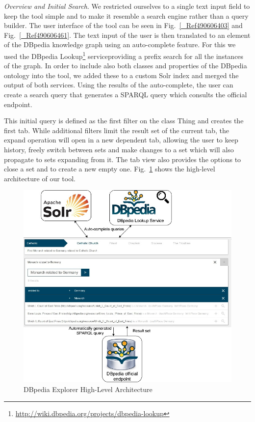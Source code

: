 \documentclass{sig-alternate}
\makeatletter
\def\maxwidth#1{\ifdim\Gin@nat@width>#1 #1\else\Gin@nat@width\fi}
\makeatother
\begin{document}
{\em Overview and Initial Search}. We restricted ourselves to a single text input ﬁeld to keep the tool simple and to make it resemble a search engine rather than a query builder. The user interface of the tool can be seen in Fig.~\ref{_Ref490606403} and Fig.~\ref{_Ref490606461}. The text input of the user is then translated to an element of the DBpedia knowledge graph using an auto-complete feature. For this we used the DBpedia Lookup\footnote{\url{http://wiki.dbpedia.org/projects/dbpedia-lookup}} service\textsuperscript{}providing a preﬁx search for all the instances of the graph. In order to include also both classes and properties of the DBpedia ontology into the tool, we added these to a custom Solr index and merged the output of both services. Using the results of the auto-complete, the user can create a search query that generates a SPARQL query which consults the oﬃcial endpoint. 

This initial query is deﬁned as the ﬁrst filter on the class Thing and creates the ﬁrst tab. While additional filters limit the result set of the current tab, the expand operation will open in a new dependent tab, allowing the user to keep history, freely switch between sets and make changes to a set which will also propagate to sets expanding from it. The tab view also provides the options to close a set and to create a new empty one. Fig.~\ref{_Ref490605913} shows the high-level architecture of our tool.
\begin{figure}[h!]
\centering
\includegraphics[width=\maxwidth{\columnwidth}]{./img/image1.jpeg}
\cprotect\caption{  DBpedia  Explorer High-Level Architecture}
\label{_Ref490605913}
\end{figure}
\end{document}

